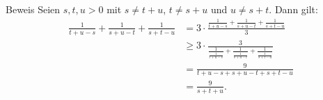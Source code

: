 \documentclass[10pt]{beamer}
\begin{document}
\begin{frame}{Beweis}
    Seien \( s, t, u > 0 \) mit \( s \neq t + u \), \( t \neq s+ u \) und \( u \neq s + t \). Dann gilt:
    \begin{align*}
        \frac{1}{t + u - s} + \frac{1}{s + u - t} + \frac{1}{s + t - u}
        & = 3 \cdot \frac{\frac{1}{t + u - s} + \frac{1}{s + u - t} + \frac{1}{s + t - u}}{3} \\
        & \geq 3 \cdot \frac{3}{\frac{1}{\frac{1}{t + u - s}} + \frac{1}{\frac{1}{s + u - t}} + \frac{1}{\frac{1}{s + t - u}}} \\
        & = \frac{9}{t + u - s + s + u - t + s + t - u} \\
        & = \frac{9}{s + t + u}.
    \end{align*}
\end{frame}
\end{document}
